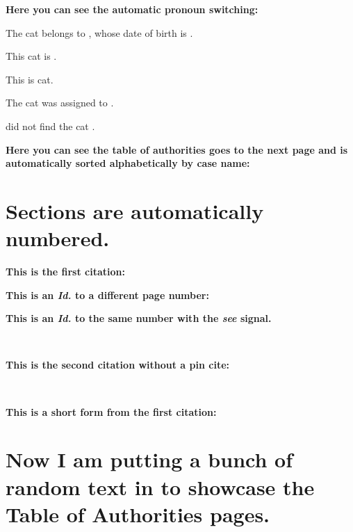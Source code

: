 \documentclass[12pt]{article}
\begin{document}
\raggedright{}


\noindent\textbf{Here you can see the automatic pronoun switching:}
\vspace{2em}

The cat belongs to \clientname{}, whose date of birth is \clientdob{}.

This cat is \theirs{}.

This is \their{} cat.

The cat was assigned to \them{}.

\They{} did not find the cat \themselves{}.
\vspace{2em}

\noindent\textbf{Here you can see the table of authorities goes to the next page and is automatically sorted alphabetically by case name:}


\clearpage
\printbibliography[keyword={case},title={\centering\normalsize\scshape{}Table of Authorities\\\small{}Cases\hfill{}Page(s)}]
\printbibliography[keyword={statute},title={\raggedright \small \scshape Statutes}]
\clearpage

\justify
\section{Sections are automatically numbered.}

\textbf{This is the first citation:}

\cite[413]{Northland2020}

\lipsum[1]
\textbf{This is an \emph{Id.} to a different page number:}

\cite[412]{Northland2020}

\textbf{This is an \emph{Id.} to the same number with the \emph{see} signal.}

\lipsum[1]~\cite[See][412]{Northland2020}

\textbf{This is the second citation without a pin cite:}

\lipsum[1]~\cite{Gordon2000}

\textbf{This is a short form from the first citation:}

\section{Now I am putting a bunch of random text in to showcase the Table of Authorities pages.}

\lipsum[1]~\cite[412]{Northland2020}
\lipsum[1]
\lipsum[1]
\lipsum[1]
\lipsum[1]~\cite[412]{Northland2020}
\lipsum[1]
\lipsum[1]
\lipsum[1]~\cite[130]{Gordon2000}
\lipsum[1]
\lipsum[1]
\lipsum[1]~\cite[412]{Northland2020}
\lipsum[1]
\lipsum[1]
\lipsum[1]~\cite[130]{Gordon2000}
\lipsum[1]~\cite[412]{Northland2020}
\lipsum[1]~\cite[130]{Gordon2000}
\lipsum[1]~\cite[412]{Northland2020}
\end{document}
